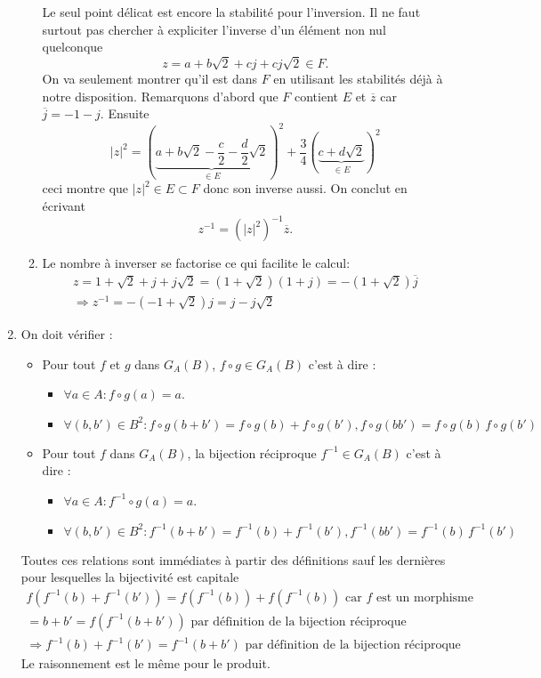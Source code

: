 \begin{enumerate}
\begin{enumerate}
Le seul point d\'{e}licat est encore la stabilit\'{e} pour l'inversion. Il ne faut surtout pas chercher \`{a} expliciter l'inverse d'un \'{e}l\'{e}ment non nul quelconque
\begin{displaymath}
 z=a+b\sqrt{2}+cj+cj\sqrt{2} \in F.
\end{displaymath}
 On va seulement montrer qu'il est dans $F$ en utilisant les stabilités déjà à notre disposition.
Remarquons d'abord que $F$ contient $E$ et $\overline{z}$ car $\overline{j}=-1-j.$ Ensuite 
\[
\left| z\right| ^{2}=(\underset{\in E}{\underbrace{a+b\sqrt{2}-\frac{c}{2} -\frac{d}{2}\sqrt{2}}})^{2} + \frac{3}{4}(\underset{\in E}{\underbrace{c+d\sqrt{2}}})^{2}
\]
ceci montre que $\left| z\right| ^{2}\in E\subset F$ donc son inverse aussi. On conclut en \'{e}crivant 
\[
z^{-1}=\left( \left| z\right| ^{2}\right) ^{-1}\overline{z}\text{.}
\] 
\item Le nombre à inverser se factorise ce qui facilite le calcul:
\begin{multline*}
 z=1+\sqrt{2} + j +j\sqrt{2} = (1+\sqrt{2})(1+j)=-(1+\sqrt{2})\overline{j}\\
\Rightarrow
z^{-1}= - (-1+\sqrt{2})j = j -j\sqrt{2}
\end{multline*}

\end{enumerate}

\item  On doit vérifier :
\begin{itemize}
 \item Pour tout $f$ et $g$ dans $G_A(B)$, $f\circ g\in G_A(B)$ c'est à dire :
\begin{itemize}
 \item $\forall a \in A : f\circ g(a) = a$.
\item $\forall(b,b')\in B^2 : f\circ g (b+b')=f\circ g (b)+f\circ g (b'), f\circ g (bb')=f\circ g (b)\,f\circ g (b')$
\end{itemize}
 \item Pour tout $f$ dans $G_A(B)$, la bijection réciproque $f^{-1}\in G_A(B)$ c'est à dire :
\begin{itemize}
 \item $\forall a \in A : f^{-1}\circ g(a) = a$.
\item $\forall(b,b')\in B^2 : f^{-1} (b+b')=f^{-1} (b)+f^{-1} (b'), f^{-1} (bb')=f^{-1} (b)\,f^{-1} (b')$
\end{itemize}
\end{itemize}
Toutes ces relations sont immédiates à partir des définitions sauf les dernières pour lesquelles la bijectivité est capitale
\begin{multline*}
 f(f^{-1}(b)+f^{-1}(b')) = f(f^{-1}(b))+f(f^{-1}(b))\text{ car $f$ est un morphisme}\\
=b+b' = f(f^{-1}(b+b')) \text{ par définition de la bijection réciproque}\\
\Rightarrow f^{-1}(b)+f^{-1}(b')= f^{-1}(b+b') \text{ par définition de la bijection réciproque}
\end{multline*}
Le raisonnement est le même pour le produit.


\end{enumerate}
